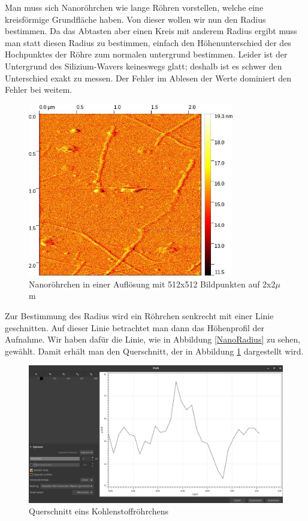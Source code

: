 Man muss sich Nanoröhrchen wie lange Röhren vorstellen, welche eine kreisförmige Grundfläche haben. Von dieser wollen wir nun den 
Radius bestimmen. Da das Abtasten aber einen Kreis mit anderem Radius ergibt muss man statt diesen Radius zu bestimmen, einfach 
den Höhenunterschied der des Hochpunktes der Röhre zum normalen untergrund bestimmen. Leider ist der Untergrund des Silizium-Wavers 
keineswegs glatt; deshalb ist es schwer den Unterschied exakt zu messen. Der Fehler im Ablesen der Werte dominiert den Fehler bei weitem. 
\begin{figure}
    \centering
    \includegraphics[width = 9cm]{Bilder/Nanotubes/NanoTube2um.jpg}
    \caption{Nanoröhrchen in einer Auflösung mit 512x512 Bildpunkten auf 2x2$\mu$m}
\end{figure}

Zur Bestimmung des Radius wird ein Röhrchen senkrecht mit einer Linie geschnitten. Auf dieser Linie betrachtet man dann das Höhenprofil der Aufnahme. Wir haben dafür die 
Linie, wie in Abbildung \ref{NanoRadius} zu sehen, gewählt. Damit erhält man den Querschnitt, der in Abbildung \ref{NanoQuerschnitt} 
dargestellt wird.

\begin{figure}
    \centering
    \includegraphics[width = \linewidth]{Bilder/Nanotubes/NanotubesBreiteHoehe.png}
    \caption{Querschnitt eins Kohlenstoffröhrchens}
    \label{NanoQuerschnitt}
\end{figure}

